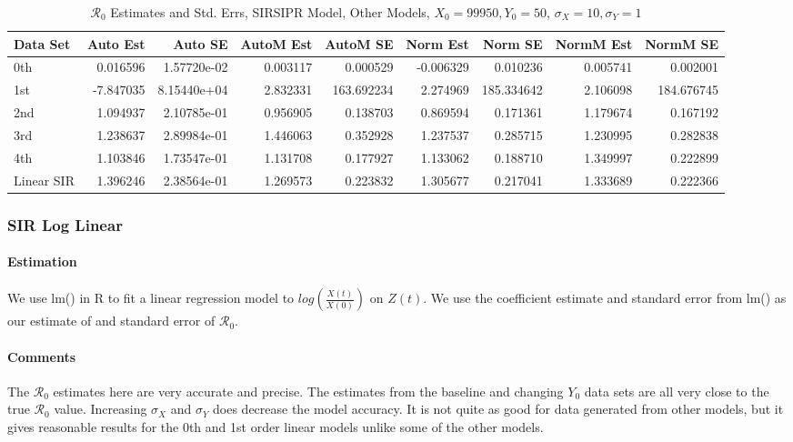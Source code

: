 \documentclass[12pt]{article}
\newcommand{\rr}{\ensuremath{\mathcal{R}_0}}
\begin{document}
\begin{table}[H]
	
	\caption{$\rr$ Estimates and Std. Errs, SIRSIPR Model,
		Other Models, $X_0 = 99950, Y_0 = 50$, 
		$\sigma_X = 10, \sigma_Y = 1$}
	\begin{footnotesize}
		\hskip -1cm
		\begin{tabular}{l|r|r|r|r|r|r|r|r}
			\hline
			Data Set & Auto Est & Auto SE & AutoM Est & AutoM SE & Norm Est & Norm SE & NormM Est & NormM SE\\
			\hline
			0th & 0.016596 & 1.57720e-02 & 0.003117 & 0.000529 & -0.006329 & 0.010236 & 0.005741 & 0.002001\\
			\hline
			1st & -7.847035 & 8.15440e+04 & 2.832331 & 163.692234 & 2.274969 & 185.334642 & 2.106098 & 184.676745\\
			\hline
			2nd & 1.094937 & 2.10785e-01 & 0.956905 & 0.138703 & 0.869594 & 0.171361 & 1.179674 & 0.167192\\
			\hline
			3rd & 1.238637 & 2.89984e-01 & 1.446063 & 0.352928 & 1.237537 & 0.285715 & 1.230995 & 0.282838\\
			\hline
			4th & 1.103846 & 1.73547e-01 & 1.131708 & 0.177927 & 1.133062 & 0.188710 & 1.349997 & 0.222899\\
			\hline
			Linear SIR & 1.396246 & 2.38564e-01 & 1.269573 & 0.223832 & 1.305677 & 0.217041 & 1.333689 & 0.222366\\
			\hline
		\end{tabular}
	\end{footnotesize}
\end{table}

\subsubsection{SIR Log Linear}

\paragraph{Estimation}

We use lm() in R to fit a linear regression model to $log(\frac{X(t)}{X(0)})$ on $Z(t)$. We use the coefficient estimate and standard error from lm() as our estimate of and standard error of $\rr$.

\paragraph{Comments}

The $\rr$ estimates here are very accurate and precise. The estimates from the baseline and changing $Y_0$ data sets are all very close to the true $\rr$ value. Increasing $\sigma_X$ and $\sigma_Y$ does decrease the model accuracy. It is not quite as good for data generated from other models, but it gives reasonable results for the 0th and 1st order linear models unlike some of the other models.
\end{document}
